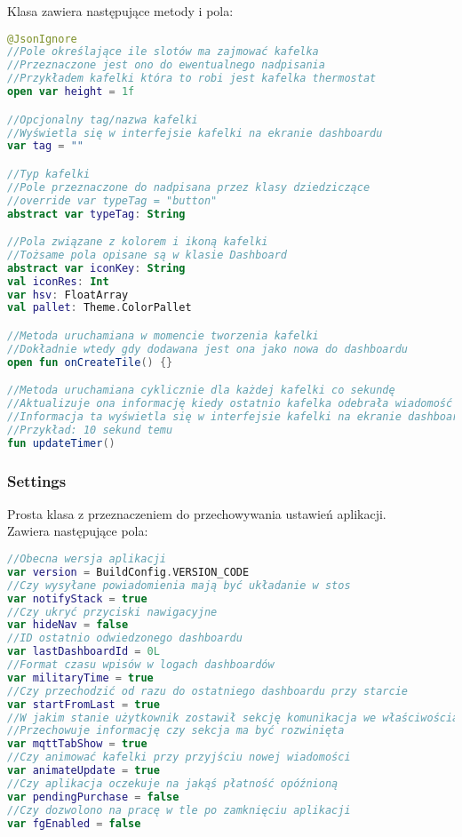 Klasa  zawiera następujące metody i pola:
\begin{lstlisting}[language=Kotlin]
@JsonIgnore
//Pole określające ile slotów ma zajmować kafelka
//Przeznaczone jest ono do ewentualnego nadpisania
//Przykładem kafelki która to robi jest kafelka thermostat
open var height = 1f

//Opcjonalny tag/nazwa kafelki
//Wyświetla się w interfejsie kafelki na ekranie dashboardu
var tag = ""

//Typ kafelki
//Pole przeznaczone do nadpisana przez klasy dziedziczące
//override var typeTag = "button"
abstract var typeTag: String

//Pola związane z kolorem i ikoną kafelki
//Tożsame pola opisane są w klasie Dashboard
abstract var iconKey: String
val iconRes: Int
var hsv: FloatArray
val pallet: Theme.ColorPallet

//Metoda uruchamiana w momencie tworzenia kafelki
//Dokładnie wtedy gdy dodawana jest ona jako nowa do dashboardu
open fun onCreateTile() {}

//Metoda uruchamiana cyklicznie dla każdej kafelki co sekundę
//Aktualizuje ona informację kiedy ostatnio kafelka odebrała wiadomość
//Informacja ta wyświetla się w interfejsie kafelki na ekranie dashboardu
//Przykład: 10 sekund temu
fun updateTimer()
\end{lstlisting}

\newpage

\subsubsection{Settings}
Prosta klasa z przeznaczeniem do przechowywania ustawień aplikacji.\\
Zawiera następujące pola:

\begin{lstlisting}[language=Kotlin]
//Obecna wersja aplikacji
var version = BuildConfig.VERSION_CODE
//Czy wysyłane powiadomienia mają być układanie w stos
var notifyStack = true
//Czy ukryć przyciski nawigacyjne
var hideNav = false
//ID ostatnio odwiedzonego dashboardu
var lastDashboardId = 0L
//Format czasu wpisów w logach dashboardów
var militaryTime = true
//Czy przechodzić od razu do ostatniego dashboardu przy starcie
var startFromLast = true
//W jakim stanie użytkownik zostawił sekcję komunikacja we właściwościach kafelek
//Przechowuje informację czy sekcja ma być rozwinięta
var mqttTabShow = true
//Czy animować kafelki przy przyjściu nowej wiadomości
var animateUpdate = true
//Czy aplikacja oczekuje na jakąś płatność opóźnioną
var pendingPurchase = false
//Czy dozwolono na pracę w tle po zamknięciu aplikacji
var fgEnabled = false
\end{lstlisting}

